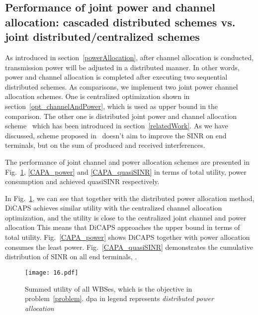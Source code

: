 \subsection{Performance of joint power and channel allocation: cascaded distributed schemes vs. joint distributed/centralized schemes}
As introduced in section~\ref{powerAllocation}, after channel allocation is conducted, transmission power will be adjusted in a distributed manner. 
In other words, power and channel allocation is completed after executing two sequential distributed schemes.
As comparisons, we implement two joint power channel allocation schemes.
One is centralized optimization shown in section~\ref{opt_channelAndPower}, which is used as upper bound in the comparison.
The other one is distributed joint power and channel allocation scheme~\cite{pimrc_2012} which has been introduced in section~\ref{relatedWork}.
As we have discussed, scheme proposed in~\cite{pimrc_2012} doesn't aim to improve the SINR on end terminals, but on the sum of produced and received interferences.

The performance of joint channel and power allocation schemes are presented in Fig.~\ref{CAPA_utility}, \ref{CAPA_power} and \ref{CAPA_quasiSINR} in terms of total utility, power consumption and achieved quasiSINR respectively.

In Fig.~\ref{CAPA_utility}, we can see that together with the distributed power allocation method, DiCAPS achieves similar utility with the centralized channel allocation optimization, and the utility is close to the centralized joint channel and power allocation
This means that DiCAPS approaches the upper bound in terms of total utility.
Fig.~\ref{CAPA_power} shows DiCAPS together with power allocation consumes the least power.
Fig.~\ref{CAPA_quasiSINR} demonstrates the cumulative distribution of SINR on all end terminals,
.

\begin{figure}[h!]
  \centering
  \texttt{[image: 16.pdf]}
  \caption{Summed utility of all WBSes, which is the objective in problem~\ref{problem}. dpa in legend represents \textit{distributed power allocation}}
\label{CAPA_utility}
\end{figure}





